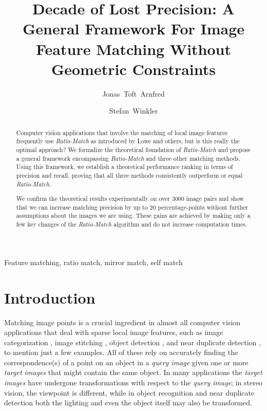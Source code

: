 \documentclass[review]{elsarticle}
\begin{document}
\title{Decade of Lost Precision:
A General Framework For Image Feature Matching Without Geometric Constraints}

\author[adsc]{Jonas~Toft~Arnfred}
\author[adsc]{Stefan~Winkler}

\address[adsc]{Advanced Digital Sciences Center (ADSC), University of Illinois at Urbana-Champaign (UIUC), Singapore}

\begin{abstract}
Computer vision applications that involve the matching of local image features frequently use \emph{Ratio-Match} as introduced by Lowe and others, but is this really the optimal approach?  We formalize the theoretical foundation of \emph{Ratio-Match} and propose a general framework encompassing \emph{Ratio-Match} and three other matching methods. Using this framework, we establish a theoretical performance ranking in terms of precision and recall, proving that all three methods consistently outperform or equal \emph{Ratio-Match}.

We confirm the theoretical results experimentally on over 3000 image pairs and show that we can increase matching precision by up to 20 percentage-points without further assumptions about the images we are using.  These gains are achieved by making only a few key changes of the \emph{Ratio-Match} algorithm and do not increase computation times.
\end{abstract}

\begin{keyword}
Feature matching, ratio match, mirror match, self match
\end{keyword}

\maketitle

\section{Introduction}
%
Matching image points is a crucial ingredient in almost all computer vision applications that deal with sparse local image features, such as image categorization \cite{bosch2008scene}, image stitching \cite{brown2007automatic}, object detection \cite{zhang2007local}, and near duplicate detection \cite{zhao2009scale}, to mention just a few examples.  All of these rely on accurately finding the correspondence(s) of a point on an object in a \emph{query image} given one or more \emph{target images} that might contain the same object.  In many applications the \emph{target images} have undergone transformations with respect to the \emph{query image}; in stereo vision, the viewpoint is different, while in object recognition and near duplicate  detection both the lighting and even the object itself may also be transformed.
\end{document}
